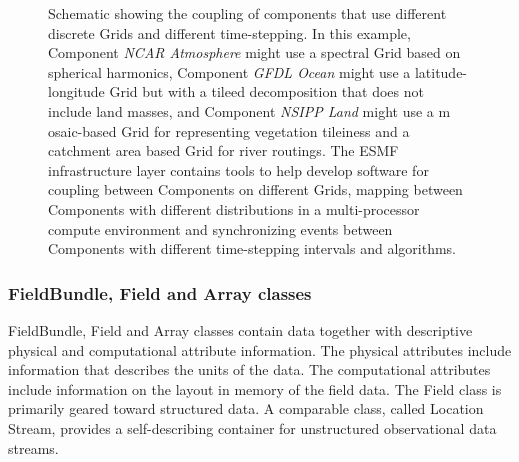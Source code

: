 \begin{figure}
\caption{Schematic showing the coupling of components that use different discrete 
Grids and different time-stepping.  In this example, Component {\it NCAR Atmosphere} 
might use a spectral Grid based on spherical harmonics, Component
{\it GFDL Ocean} might use a latitude-longitude Grid but with a tileed decomposition 
that does not include land masses, and Component {\it NSIPP Land} might use a m
osaic-based Grid for representing vegetation tileiness and a catchment area based 
Grid for river routings. The ESMF infrastructure layer contains tools to help develop 
software for coupling between Components on different Grids, mapping between Components 
with different distributions in a multi-processor compute environment and synchronizing 
events between Components with different time-stepping intervals 
and algorithms.  }
\label{fig:threecomponents}
\end{figure}

\subsubsection{FieldBundle, Field and Array classes}
FieldBundle, Field and Array classes contain data together with descriptive
physical and computational attribute information. The physical attributes 
include information that describes the units of the data. The computational 
attributes include information on the layout in memory of the field data. The 
Field class is primarily geared toward structured data. A comparable class, 
called Location Stream, provides a self-describing
container for unstructured observational data streams.

